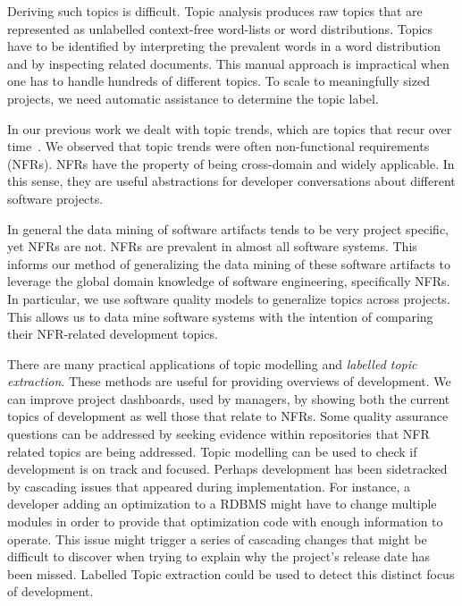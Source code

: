 \documentclass[]{sig-alternate}
\begin{document}
Deriving such topics is difficult. 
Topic analysis produces raw topics that are represented as unlabelled context-free word-lists or word distributions.
Topics have to be identified by interpreting the prevalent words in a word distribution and by inspecting related documents. 
This manual approach is impractical when one has to handle hundreds of different topics. To scale to meaningfully sized projects, we need automatic assistance to determine the topic label.


In our previous work we dealt with topic trends, which are topics that recur over time~\cite{Hindle09ICSM}. 
We observed that topic trends were often non-functional requirements (NFRs). 
NFRs have the property of being cross-domain and widely applicable. 
In this sense, they are useful abstractions for developer conversations about different software projects.

In general the data mining of software artifacts tends to be very project specific, yet NFRs are not. 
NFRs are prevalent in almost all software systems.
This informs our method of generalizing the data mining of these software artifacts to leverage the global domain knowledge of software engineering, specifically NFRs. In particular, we use software quality models to generalize topics across projects. 
This allows us to data mine software systems with the intention of comparing their NFR-related development topics.

There are many practical applications of topic modelling and \emph{labelled  topic extraction}.
These methods are useful for providing overviews of development.
We can improve project dashboards, used by managers, by showing both the current topics of development as well those that relate to NFRs.
Some quality assurance questions can be addressed by seeking evidence within repositories that NFR related topics are being addressed.
Topic modelling can be used to check if development is on track and focused.
Perhaps development has been sidetracked by cascading issues that appeared during implementation.
For instance, a developer adding an optimization to a RDBMS might have to change multiple modules in order to provide that optimization code with enough information to operate. 
This issue might trigger a series of cascading changes that might be difficult to discover when trying to explain why the project's release date has been missed. 
Labelled Topic extraction could be used to detect this distinct focus of development.
\end{document}

